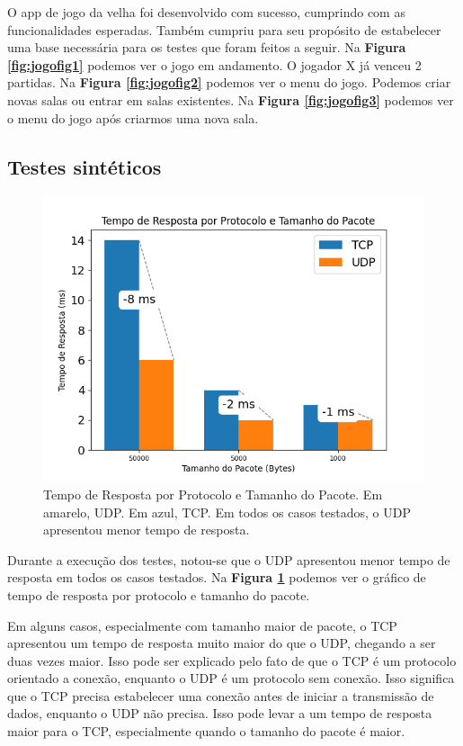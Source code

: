 \documentclass[12pt]{article}
\begin{document}
O app de jogo da velha foi desenvolvido com sucesso, cumprindo com as funcionalidades esperadas. Também cumpriu para seu propósito de estabelecer uma base necessária para os testes que foram feitos a seguir.
Na {\bf Figura \ref{fig:jogofig1}} podemos ver o jogo em andamento. O jogador X já venceu 2 partidas. Na {\bf Figura \ref{fig:jogofig2}} podemos ver o menu do jogo. Podemos criar novas salas ou entrar em salas existentes. Na {\bf Figura \ref{fig:jogofig3}} podemos ver o menu do jogo após criarmos uma nova sala.

\break
\subsection{Testes sintéticos}

\begin{figure}[ht]
\centering
\includegraphics[width=1\textwidth]{grafico_2.png}
\caption{Tempo de Resposta por Protocolo e Tamanho do Pacote. Em amarelo, UDP. Em azul, TCP. Em todos os casos testados, o UDP apresentou menor tempo de resposta.}
\label{fig:graficofig}
\end{figure}

Durante a execução dos testes, notou-se que o UDP apresentou menor tempo de resposta em todos os casos testados. Na {\bf Figura \ref{fig:graficofig}} podemos ver o gráfico de tempo de resposta por protocolo e tamanho do pacote.

Em alguns casos, especialmente com tamanho maior de pacote, o TCP apresentou um tempo de resposta muito maior do que o UDP, chegando a ser duas vezes maior. Isso pode ser explicado pelo fato de que o TCP é um protocolo orientado a conexão, enquanto o UDP é um protocolo sem conexão. Isso significa que o TCP precisa estabelecer uma conexão antes de iniciar a transmissão de dados, enquanto o UDP não precisa. Isso pode levar a um tempo de resposta maior para o TCP, especialmente quando o tamanho do pacote é maior.
\end{document}
